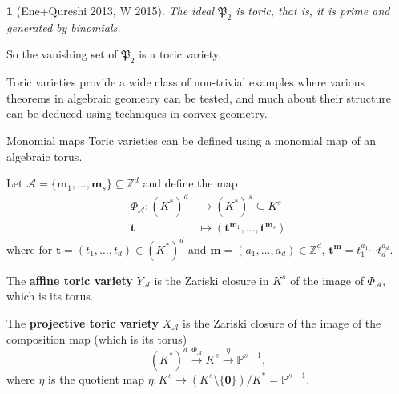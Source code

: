 \documentclass[mathserif
    , handout
   ]{beamer}
\newcommand{\pr}{\mathfrak P}
\newcommand{\vect}[1]{\mathbf#1}
\newcommand{\Z}{\mathbb Z}
\newcommand{\Prj}{\mathbb P}
\theoremstyle{plain}
\newtheorem{thm}{\color{white}{Theorem}}[subsection]
\theoremstyle{definition}
\theoremstyle{remark}
\begin{document}
\begin{frame}
\begin{thm}[Ene+Qureshi 2013, W 2015]
The ideal $\pr_2$ is toric, that is, it is prime and generated by binomials.
\end{thm}  

\pause 
\vspace{0.75pc}
So the vanishing set of $\pr_2$ is a toric variety.

\pause 
\vspace{0.75pc}
Toric varieties provide a wide class of non-trivial examples where various theorems in algebraic geometry can be tested, and much about their structure can be deduced using techniques in convex geometry.
\end{frame}


\begin{frame}{Monomial maps}
Toric varieties can be defined using a monomial map of an algebraic torus.

\pause 
\vspace{0.75pc}
Let $\mathscr A=\{\vect m_1,\dots,\vect m_s\}\subseteq \Z^d$ and define the map
\begin{align*}
\Phi_{\mathscr A}: (K^*)^d &\to (K^*)^s\subseteq K^s \\
\vect t &\mapsto (\vect t^{\vect m_1},\dots,\vect t^{\vect m_s})
\end{align*}
where for $\vect t=(t_1,\dots,t_d)\in (K^*)^d$ and $\vect m=(a_1,\dots,a_d)\in \Z^d$, $\vect t^{\vect m}=t_1^{a_1}\cdots t_d^{a_d}$.
\end{frame}

\begin{frame}
The \textbf{affine toric variety} $Y_{\mathscr A}$ is the Zariski closure in $K^s$ of the image of $\Phi_{\mathscr A}$, which is its torus.

\pause
\vspace{0.75pc}
The \textbf{projective toric variety} $X_{\mathscr A}$ is the Zariski closure of the image of the composition map (which is its torus)
\[(K^\ast)^d\xrightarrow{\Phi_{\mathscr{A}}}K^s\xrightarrow{\eta}\Prj^{s-1},\]
where $\eta$ is the quotient map $\eta: K^s\to (K^s\setminus \{\vect 0\})/K^*=\Prj^{s-1}$.
\end{frame}
\end{document}
